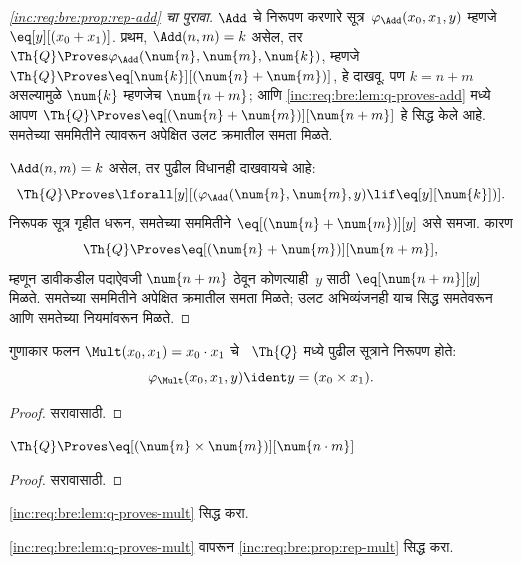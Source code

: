 \begin{proof}[\ref{inc:req:bre:prop:rep-add} चा पुरावा]
$\Add$ चे निरूपण करणारे सूत्र~$\varphi_\Add(x_0, x_1, y)$
म्हणजे $\eq[y][(x_0 + x_1)]$. प्रथम, $\Add(n, m) = k$
असेल, तर $\Th{Q} \Proves \varphi_\Add(\num{n}, \num{m}, \num{k})$,
म्हणजे $\Th{Q}
\Proves \eq[\num{k}][(\num{n} + \num{m})]$, हे दाखवू.
पण $k = n + m$ असल्यामुळे $\num{k}$ म्हणजेच $\num{n+m}$;
आणि \ref{inc:req:bre:lem:q-proves-add} मध्ये आपण
$\Th{Q} \Proves \eq[(\num{n} +
  \num{m})][\num{n+m}]$ हे सिद्ध केले आहे. समतेच्या
सममितीने त्यावरून अपेक्षित उलट क्रमातील समता मिळते.

$\Add(n, m) = k$ असेल, तर पुढील विधानही दाखवायचे आहे:
\[\Th{Q} \Proves \lforall[y][(\varphi_\Add(\num{n}, \num{m}, y) \lif
  \eq[y][\num{k}])].
\]
निरूपक सूत्र गृहीत धरून, समतेच्या सममितीने
$\eq[(\num{n} + \num{m})][y]$ असे समजा. कारण
\[\Th{Q} \Proves \eq[(\num{n}+\num{m})][\num{n+m}],
\]
म्हणून डावीकडील पदाऐवजी $\num{n+m}$ ठेवून कोणत्याही~$y$
साठी $\eq[\num{n+m}][y]$ मिळते. समतेच्या सममितीने
अपेक्षित क्रमातील समता मिळते; उलट अभिव्यंजनही याच सिद्ध
समतेवरून आणि समतेच्या नियमांवरून मिळते.
\end{proof}

\begin{prop}
\label{inc:req:bre:prop:rep-mult}
गुणाकार फलन $\Mult(x_0, x_1) = x_0 \cdot x_1$ चे
~$\Th{Q}$ मध्ये पुढील सूत्राने निरूपण होते:
\[  \varphi_{\Mult}(x_0, x_1, y) \ident y = (x_0 \times x_1).
\]
\end{prop}

\begin{proof} सरावासाठी. \end{proof}

\begin{lem}
\label{inc:req:bre:lem:q-proves-mult}
$\Th{Q} \Proves \eq[(\num{n} \times \num{m})][\num{n \cdot m}]$
\end{lem}

\begin{proof} सरावासाठी. \end{proof}

\begin{prob}
\ref{inc:req:bre:lem:q-proves-mult} सिद्ध करा.
\end{prob}

\begin{prob}
\ref{inc:req:bre:lem:q-proves-mult} वापरून
\ref{inc:req:bre:prop:rep-mult} सिद्ध करा.
\end{prob}

